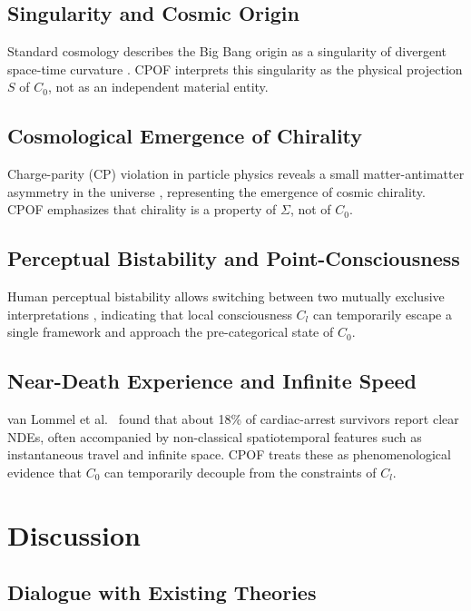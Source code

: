 \documentclass[11pt,a4paper]{article}
\begin{document}
\subsection{Singularity and Cosmic Origin}

Standard cosmology describes the Big Bang origin as a singularity of divergent space-time curvature \cite{hawking1973}. CPOF interprets this singularity as the physical projection $S$ of $C_0$, not as an independent material entity.

\subsection{Cosmological Emergence of Chirality}

Charge-parity (CP) violation in particle physics reveals a small matter-antimatter asymmetry in the universe \cite{cronin1981}, representing the emergence of cosmic chirality. CPOF emphasizes that chirality is a property of $\Sigma$, not of $C_0$.

\subsection{Perceptual Bistability and Point-Consciousness}

Human perceptual bistability allows switching between two mutually exclusive interpretations \cite{leopold1999,ramachandran2011}, indicating that local consciousness $C_l$ can temporarily escape a single framework and approach the pre-categorical state of $C_0$.

\subsection{Near-Death Experience and Infinite Speed}

van Lommel et al.~\cite{vanlommel2001} found that about 18\% of cardiac-arrest survivors report clear NDEs, often accompanied by non-classical spatiotemporal features such as instantaneous travel and infinite space. CPOF treats these as phenomenological evidence that $C_0$ can temporarily decouple from the constraints of $C_l$.

\section{Discussion}

\subsection{Dialogue with Existing Theories}
\end{document}
